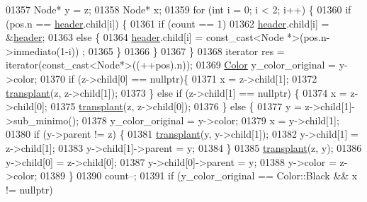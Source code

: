 \begin{DoxyCode}
01357         Node* y = z;
01358         Node* x;
01359         \textcolor{keywordflow}{for} (\textcolor{keywordtype}{int} i = 0; i < 2; i++) \{
01360             \textcolor{keywordflow}{if} (pos.n == \hyperlink{classaed2_1_1map_a92d93f905c8ad73fba18fdc7e8915cce_a92d93f905c8ad73fba18fdc7e8915cce}{header}.child[i]) \{
01361                 \textcolor{keywordflow}{if} (count == 1)
01362                     \hyperlink{classaed2_1_1map_a92d93f905c8ad73fba18fdc7e8915cce_a92d93f905c8ad73fba18fdc7e8915cce}{header}.child[i] = &\hyperlink{classaed2_1_1map_a92d93f905c8ad73fba18fdc7e8915cce_a92d93f905c8ad73fba18fdc7e8915cce}{header};
01363                 \textcolor{keywordflow}{else} \{
01364                     \hyperlink{classaed2_1_1map_a92d93f905c8ad73fba18fdc7e8915cce_a92d93f905c8ad73fba18fdc7e8915cce}{header}.child[i] = \textcolor{keyword}{const\_cast<}Node *\textcolor{keyword}{>}(pos.n->inmediato(1-i))
      ;
01365                 \}
01366             \}
01367         \}
01368         iterator res = iterator(const\_cast<Node*>((++pos).n));
01369         \hyperlink{classaed2_1_1map_a6d62a415a4b9d320b30cada4ebcf9f5b_a6d62a415a4b9d320b30cada4ebcf9f5b}{Color} y\_color\_original = y->color;
01370         \textcolor{keywordflow}{if} (z->child[0] == \textcolor{keyword}{nullptr})\{
01371             x = z->child[1];
01372             \hyperlink{classaed2_1_1map_a98b9f200c64ce02dfb67902ee00e375a_a98b9f200c64ce02dfb67902ee00e375a}{transplant}(z, z->child[1]);
01373         \} \textcolor{keywordflow}{else} \textcolor{keywordflow}{if} (z->child[1] == \textcolor{keyword}{nullptr}) \{
01374             x = z->child[0];
01375             \hyperlink{classaed2_1_1map_a98b9f200c64ce02dfb67902ee00e375a_a98b9f200c64ce02dfb67902ee00e375a}{transplant}(z, z->child[0]);
01376         \} \textcolor{keywordflow}{else} \{
01377             y = z->child[1]->sub\_minimo();
01378             y\_color\_original = y->color;
01379             x = y->child[1];
01380             \textcolor{keywordflow}{if} (y->parent != z) \{
01381                 \hyperlink{classaed2_1_1map_a98b9f200c64ce02dfb67902ee00e375a_a98b9f200c64ce02dfb67902ee00e375a}{transplant}(y, y->child[1]);
01382                 y->child[1] = z->child[1];
01383                 y->child[1]->parent = y;
01384             \}
01385             \hyperlink{classaed2_1_1map_a98b9f200c64ce02dfb67902ee00e375a_a98b9f200c64ce02dfb67902ee00e375a}{transplant}(z, y);
01386             y->child[0] = z->child[0];
01387             y->child[0]->parent = y;
01388             y->color = z->color;
01389         \}
01390         count--;
01391         \textcolor{keywordflow}{if} (y\_color\_original == Color::Black && x != \textcolor{keyword}{nullptr})

\end{DoxyCode}
